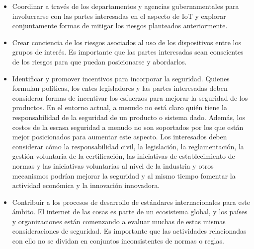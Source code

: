 \begin{itemize}
\item Coordinar a través de los departamentos y agencias gubernamentales para involucrarse con las partes interesadas en el aspecto de IoT y explorar conjuntamente formas de mitigar los riesgos planteados anteriormente.
\item Crear conciencia de los riesgos asociados al uso de los dispositivos entre los grupos de interés. Es importante que las partes interesadas sean conscientes de los riesgos para que puedan posicionarse y  abordarlos.
\item Identificar y promover incentivos para incorporar la seguridad. Quienes formulan políticas, los entes legisladores y las partes interesadas deben considerar formas de incentivar los esfuerzos para mejorar la seguridad de los productos. En el entorno actual, a menudo no está claro quién tiene la responsabilidad de la seguridad de un producto o sistema dado. Además, los costos de la escasa seguridad a menudo no son soportados por los que están mejor posicionados para aumentar este aspecto.  Los interesados deben considerar cómo la responsabilidad civil, la legislación, la reglamentación, la gestión voluntaria de la certificación, las iniciativas de establecimiento de normas y las iniciativas voluntarias al nivel de la industria y otros mecanismos podrían mejorar la seguridad y al mismo tiempo fomentar la actividad económica y la innovación innovadora.
\item Contribuir a los procesos de desarrollo de estándares internacionales para este ámbito. El internet de las cosas es parte de un ecosistema global, y los países y organizaciones están comenzando a evaluar muchas de estas mismas consideraciones de seguridad. Es importante que las actividades relacionadas con ello no se dividan en conjuntos inconsistentes de normas o reglas. 
\end{itemize}
